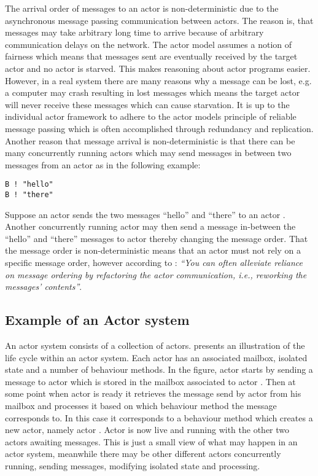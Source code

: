 The arrival order of messages to an actor is non-deterministic due to the asynchronous message passing communication between actors\cite[p. 2]{karmani2011actors}. The reason is, that messages may take arbitrary long time to arrive because of arbitrary communication delays on the network. The actor model assumes a notion of fairness which means that messages sent are eventually received by the target actor and no actor is starved\cite[Chap. 2.5]{haller2012actors}\cite[p. 3]{karmani2009actor}. This makes reasoning about actor programs easier\cite{tasharofi2013scala}. However, in a real system there are many reasons why a message can be lost, e.g. a computer may crash resulting in lost messages which means the target actor will never receive these messages which can cause starvation. It is up to the individual actor framework to adhere to the actor models principle of reliable message passing which is often accomplished through redundancy and replication\cite[Chap. 2.5]{haller2012actors}. Another reason that message arrival is non-deterministic is that there can be many concurrently running actors which may send messages in between two messages from an actor as in the following example:
\begin{verbatim}
B ! "hello"
B ! "there"
\end{verbatim}
Suppose an actor  sends the two messages ``hello'' and ``there'' to an actor . Another concurrently running actor  may then send a message in-between the ``hello'' and ``there'' messages to actor  thereby changing the message order. That the message order is non-deterministic means that an actor must not rely on a specific message order, however according to \cite[p. 35]{haller2012actors}: \textit{``You can often alleviate reliance on message ordering by refactoring the actor communication, i.e., reworking the messages' contents''}.

\subsection{Example of an Actor system}
An actor system consists of a collection of actors.  presents an illustration of the life cycle within an actor system. Each actor has an associated mailbox, isolated state and a number of behaviour methods. In the figure, actor  starts by sending a message to actor  which is stored in the mailbox associated to actor . Then at some point when actor  is ready it retrieves the message send by actor  from his mailbox and processes it based on which behaviour method the message corresponds to. In this case it corresponds to a behaviour method which creates a new actor, namely actor . Actor  is now live and running with the other two actors awaiting messages. This is just a small view of what may happen in an actor system, meanwhile there may be other different actors concurrently running, sending messages, modifying isolated state and processing.


